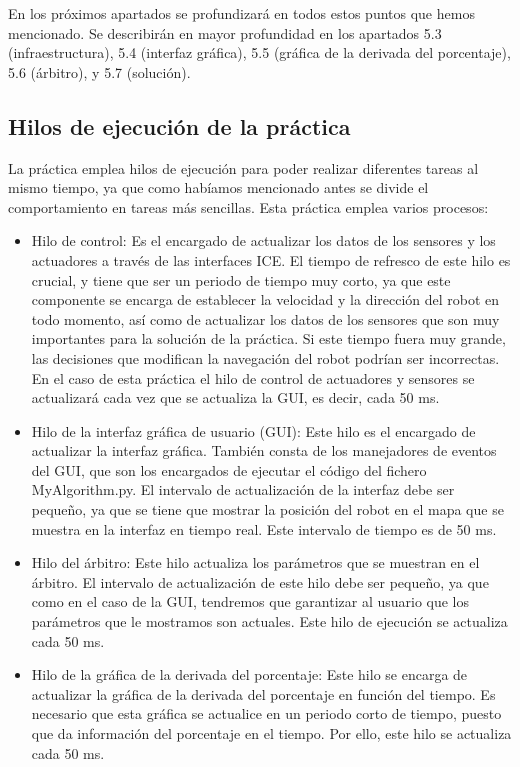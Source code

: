 En los próximos apartados se profundizará en todos estos puntos que hemos mencionado. Se describirán en mayor profundidad en los apartados 5.3 (infraestructura), 5.4 (interfaz gráfica), 5.5 (gráfica de la derivada del porcentaje), 5.6 (árbitro), y 5.7 (solución).\\

\subsection{Hilos de ejecución de la práctica}
La práctica emplea hilos de ejecución para poder realizar diferentes tareas al mismo tiempo, ya que como habíamos mencionado antes se divide el comportamiento en tareas más sencillas. Esta práctica emplea varios procesos:

\begin{itemize}
\item Hilo de control: Es el encargado de actualizar los datos de los sensores y los actuadores a través de las interfaces ICE. El tiempo de refresco de este hilo es crucial, y tiene que ser un periodo de tiempo muy corto, ya que este componente se encarga de establecer la velocidad y la dirección del robot en todo momento, así como de actualizar los datos de los sensores que son muy importantes para la solución de la práctica. Si este tiempo fuera muy grande, las decisiones que modifican la navegación del robot podrían ser incorrectas. En el caso de esta práctica el hilo de control de actuadores y sensores se actualizará cada vez que se actualiza la GUI, es decir, cada 50 ms.
\item Hilo de la interfaz gráfica de usuario (GUI): Este hilo es el encargado de actualizar la interfaz gráfica. También consta de los manejadores de eventos del GUI, que son los encargados de ejecutar el código del fichero MyAlgorithm.py. El intervalo de actualización de la interfaz debe ser pequeño, ya que se tiene que mostrar la posición del robot en el mapa que se muestra en la interfaz en tiempo real. Este intervalo de tiempo es de 50 ms.
\item Hilo del árbitro: Este hilo actualiza los parámetros que se muestran en el árbitro. El intervalo de actualización de este hilo debe ser pequeño, ya que como en el caso de la GUI, tendremos que garantizar al usuario que los parámetros que le mostramos son actuales. Este hilo de ejecución se actualiza cada 50 ms.
\item Hilo de la gráfica de la derivada del porcentaje: Este hilo se encarga de actualizar la gráfica de la derivada del porcentaje en función del tiempo. Es necesario que esta gráfica se actualice en un periodo corto de tiempo, puesto que da información del porcentaje en el tiempo. Por ello, este hilo se actualiza cada 50 ms.
\end{itemize}

